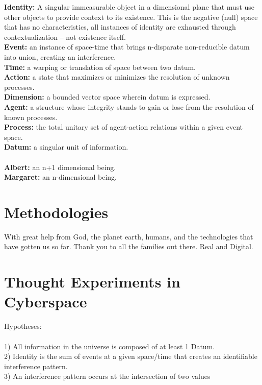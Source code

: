 \documentclass{article}
\begin{document}
\textbf{Identity:} A singular immeasurable object in a dimensional plane that must use other objects to provide context to its existence. This is the negative (null) space that has no characteristics, all instances of identity are exhausted through contextualization – not existence itself. \\
\textbf{Event:} an instance of space-time that brings n-disparate non-reducible datum into union, creating an interference. \\
\textbf{Time:} a warping or translation of space between two datum. \\
\textbf{Action:} a state that maximizes or minimizes the resolution of unknown processes.\\ 
\textbf{Dimension:} a bounded vector space wherein datum is expressed. \\
\textbf{Agent:} a structure whose integrity stands to gain or lose from the resolution of known processes.\\   
\textbf{Process:} the total unitary set of agent-action relations within a given event space. \\
\textbf{Datum:} a singular unit of information. \\\\
\textbf{Albert:} an n+1 dimensional being. \\
\textbf{Margaret:} an n-dimensional being. \\

\section{Methodologies}
With great help from God, the planet earth, humans, and the technologies that have gotten us so far. Thank you to all the families out there. Real and Digital.  

\section{Thought Experiments in Cyberspace}
Hypotheses: \\\\
1) All information in the universe is composed of at least 1 Datum. \\
2) Identity is the sum of events at a given space/time that creates an identifiable interference pattern.\\
3) An interference pattern occurs at the intersection of two values\\ 
\end{document}
